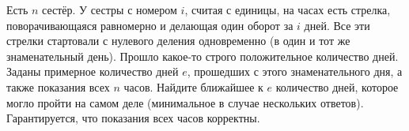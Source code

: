 Есть $n$ сестёр.
У сестры с номером $i$, считая с единицы, на часах есть стрелка,
поворачивающаяся равномерно и делающая один оборот за $i$ дней.
Все эти стрелки стартовали с нулевого деления одновременно
(в один и тот же знаменательный день).
Прошло какое-то строго положительное количество дней.
Заданы примерное количество дней $e$, прошедших с этого знаменательного дня,
а также показания всех $n$ часов.
Найдите ближайшее к $e$ количество дней, которое могло пройти на самом деле
(минимальное в случае нескольких ответов).
Гарантируется, что показания всех часов корректны.
